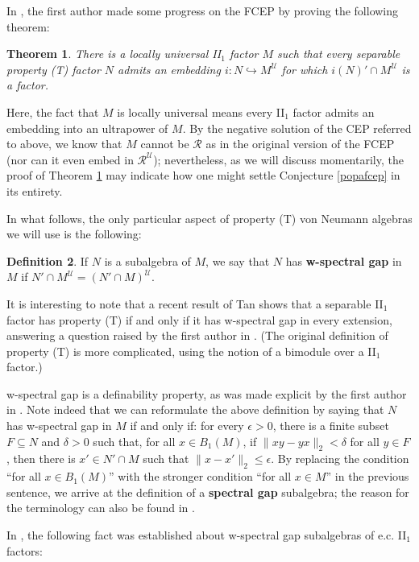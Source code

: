 \documentclass[12pt]{amsart}
\newtheorem{thm}{Theorem}[section]
\theoremstyle{definition}
\newtheorem{defn}[thm]{Definition}
\def\u{\mathsf 1}
\def \R{\mathcal R}
\def \u{\mathcal U}
\begin{document}
In \cite{fcep}, the first author made some progress on the FCEP by proving the following theorem:

\begin{thm}\label{goldfcep}
There is a \emph{locally universal} II$_1$ factor $M$ such that every separable property (T) factor $N$ admits an embedding $i:N\hookrightarrow M^\u$ for which $i(N)'\cap M^\u$ is a factor.
\end{thm}

Here, the fact that $M$ is locally universal means every II$_1$ factor admits an embedding into an ultrapower of $M$.  By the negative solution of the CEP referred to above, we know that $M$ cannot be $\R$ as in the original version of the FCEP (nor can it even embed in $\R^\u$); nevertheless, as we will discuss momentarily, the proof of Theorem \ref{goldfcep} may indicate how one might settle Conjecture \ref{popafcep} in its entirety.

In what follows, the only particular aspect of property (T) von Neumann algebras we will use is the following:

\begin{defn}
If $N$ is a subalgebra of $M$, we say that $N$ has \textbf{w-spectral gap} in $M$ if $N'\cap M^\u=(N'\cap M)^\u$.
\end{defn}

It is interesting to note that a recent result of Tan \cite{tan} shows that a separable II$_1$ factor has property (T) if and only if it has w-spectral gap in every extension, answering a question raised by the first author in \cite{fcep}.  (The original definition of property (T) is more complicated, using the notion of a bimodule over a II$_1$ factor.) 

w-spectral gap is a definability property, as was made explicit by the first author in \cite{spgap}.  Note indeed that we can reformulate the above definition by saying that $N$ has w-spectral gap in $M$ if and only if:  for every $\epsilon>0$, there is a finite subset $F\subseteq N$ and $\delta>0$ such that, for all $x\in B_1(M)$, if $\|xy-yx\|_2<\delta$ for all $y\in F$, then there is $x'\in N'\cap M$ such that $\|x-x'\|_2\leq \epsilon$.  By replacing the condition ``for all $x\in B_1(M)$'' with the stronger condition ``for all $x\in M$'' in the previous sentence, we arrive at the definition of a \textbf{spectral gap} subalgebra; the reason for the terminology can also be found in \cite{spgap}.

In \cite{spgap}, the following fact was established about w-spectral gap subalgebras of e.c. II$_1$ factors:
\end{document}
